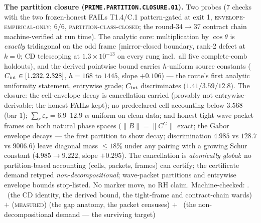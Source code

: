\documentclass[11pt,a4paper]{article}
\theoremstyle{definition}
\begin{document}
\par\smallskip\noindent\textbf{The partition closure
(\texttt{PRIME.PARTITION.\allowbreak CLOSURE.01}).}
Two probes ($7$ checks with the two frozen-honest FAILs
T1.4/C.1 pattern-gated at exit 1,
\textsc{envelope-empirical-only}; $6/6$,
\textsc{partition-class-closed}; the round-34$\to$37 contract
chain machine-verified at run time).  The analytic core:
multiplication by $\cos\theta$ is \emph{exactly} tridiagonal on
the odd frame (mirror-closed boundary, rank-2 defect at $k = 0$;
CD telescoping at $1.3\times10^{-13}$ on every rung incl.\ all
five complete-comb holdouts), and the derived pointwise bound
carries $h$-uniform source constants ($C_{\rm int} \in [1.232,
2.328]$, $h = 168$ to $1445$, slope $+0.106$) --- the route's
first analytic uniformity statement, entrywise grade; $C_{\rm
int}$ discriminates ($1.41/3.59/12.8$).  The closure: the
cell-envelope decay is cancellation-carried (provably not
entrywise-derivable; the honest FAILs kept); no predeclared cell
accounting below $3.568$ (bar $1$); $\sum_r \varepsilon_r =
6.9$--$12.9$ $\alpha$-uniform on clean data; and honest tight
wave-packet frames on both natural phase spaces ($\|B\| =
\|C^G\|$ exact; the Gabor envelope decays --- the first
partition to show decay; discrimination $4.985$ vs $128.7$ vs
$9006.6$) leave diagonal mass $\le 18\%$ under any pairing with
a growing Schur constant ($4.985 \to 9.222$, slope $+0.295$).
The cancellation is \emph{atomically global}: no partition-based
accounting (cells, packets, frames) can certify; the certificate
demand retyped \emph{non-decompositional}; wave-packet
partitions and entrywise envelope bounds stop-listed.  No marker
move, no RH claim.
Machine-checked: .
\mE\ (the CD identity, the derived bound, the tight-frame and
contract-chain wards) $+$ (\textsc{measured}) (the gap anatomy,
the packet censuses) $+$ \mO\ (the non-decompositional demand
--- the surviving target)
\par\smallskip
\end{document}
